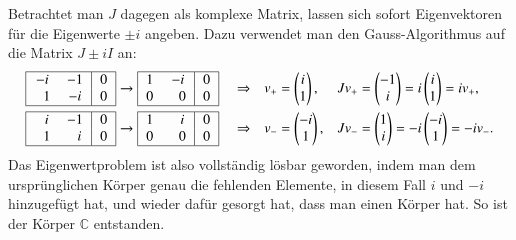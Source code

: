 Betrachtet man $J$ dagegen als komplexe Matrix, lassen sich sofort
Eigenvektoren für die Eigenwerte $\pm i$ angeben.
Dazu verwendet man den Gauss-Algorithmus auf die Matrix $J\pm iI$ an:
\[
\begin{aligned}
\begin{tabular}{|>{$}c<{$}>{$}c<{$}|>{$}c<{$}|}
\hline
         - i&-1&0\\
\phantom{-}1&-i&0\\
\hline
\end{tabular}
&\rightarrow
\begin{tabular}{|>{$}c<{$}>{$}c<{$}|>{$}c<{$}|}
\hline
 1&         - i&0\\
 0&\phantom{-}0&0\\
\hline
\end{tabular}
&&\Rightarrow
&
v_+&=\begin{pmatrix}i\\1\end{pmatrix},
&
Jv_+&=\begin{pmatrix}-1\\i\end{pmatrix}
=
i\begin{pmatrix}i\\1\end{pmatrix}
=
iv_+,
\\
\begin{tabular}{|>{$}c<{$}>{$}c<{$}|>{$}c<{$}|}
\hline
\phantom{-}i&         - 1&0\\
\phantom{-}1&\phantom{-}i&0\\
\hline
\end{tabular}
&\rightarrow
\begin{tabular}{|>{$}c<{$}>{$}c<{$}|>{$}c<{$}|}
\hline
 1&\phantom{-}i&0\\
 0&\phantom{-}0&0\\
\hline
\end{tabular}
&&\Rightarrow
&
v_-&=\begin{pmatrix}-i\\1\end{pmatrix},
&
Jv_-&=\begin{pmatrix}1\\i\end{pmatrix}
=
-i\begin{pmatrix}-i\\1\end{pmatrix}
=
-iv_-.
\end{aligned}
\]
Das Eigenwertproblem ist also vollständig lösbar geworden, indem
man dem ursprünglichen Körper genau die fehlenden Elemente, in diesem
Fall $i$ und $-i$ hinzugefügt hat, und wieder dafür gesorgt hat, dass
man einen Körper hat.
So ist der Körper $\mathbb C$ entstanden.

